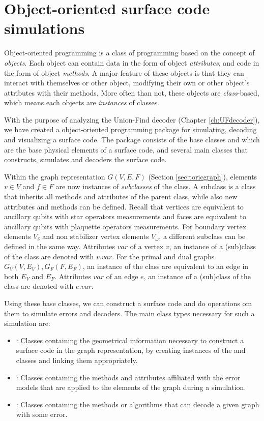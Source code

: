 \chapter{Object-oriented surface code simulations}\label{ap:oopsurfacecode}
Object-oriented programming is a class of programming based on the concept of \emph{objects}. Each object can contain data in the form of object \emph{attributes}, and code in the form of object \emph{methods}. A major feature of these objects is that they can interact with themselves or other object, modifying their own or other object's attributes with their methods. More often than not, these objects are \emph{class}-based, which means each objects are \emph{instances} of classes. 

With the purpose of analyzing the Union-Find decoder (Chapter \ref{ch:UFdecoder}), we have  created a object-oriented programming package for simulating, decoding and visualizing a surface code. The package consists of the base classes  and  which are the base physical elements of a surface code, and several main classes that constructs, simulates and decoders the surface code. 

Within the graph representation $G(V,E,F)$ (Section \ref{sec:toricgraph}), elements $v\in V$ and $f\in F$ are now instances of \emph{subclasses} of the  class. A subclass is a class that inherits all methods and attributes of the parent class, while also new attributes and methods can be defined. Recall that vertices are equivalent to ancillary qubits with star operators measurements and faces are equivalent to ancillary qubits with plaquette operators measurements. For boundary vertex elements $V_\delta$ and non stabilizer vertex elements $V_\omega$, a different subclass can be defined in the same way. Attributes $var$ of a vertex $v$, an instance of a (sub)class of the  class are denoted with $v.var$. For the primal and dual graphs $G_V(V,E_V), G_F(F,E_F)$, an instance of the  class are equivalent to an edge in both $E_V$ and $E_F$. Attributes $var$ of an edge $e$, an instance of a (sub)class of the  class are denoted with $e.var$. 

Using these base classes, we can construct a surface code and do operations om them to simulate errors and decoders. The main class types necessary for such a simulation are:
\begin{itemize}
    \item {}: Classes containing the geometrical information necessary to construct a surface code in the graph representation, by creating instances of the  and  classes and linking them appropriately.
    \item {}: Classes containing the methods and attributes affiliated with the error models that are applied to the elements of the graph during a simulation.
    \item {}: Classes containing the methods or algorithms that can decode a given graph with some error. 
\end{itemize}


